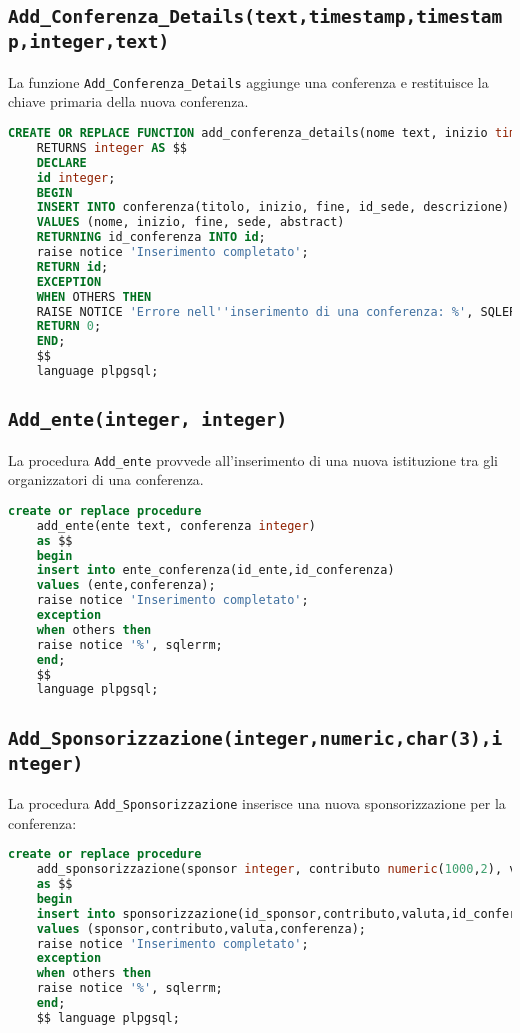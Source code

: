 \subsection{\texttt{Add\_Conferenza\_Details(text,timestamp,timestamp,integer,text)}}
La funzione \texttt{Add\_Conferenza\_Details} aggiunge una conferenza e restituisce la chiave primaria della nuova conferenza.
\begin{lstlisting}[language=SQL,style=mystyle]
	CREATE OR REPLACE FUNCTION add_conferenza_details(nome text, inizio timestamp, fine timestamp, sede integer, abstract text)
	RETURNS integer AS $$
	DECLARE
	id integer;
	BEGIN
	INSERT INTO conferenza(titolo, inizio, fine, id_sede, descrizione) 
	VALUES (nome, inizio, fine, sede, abstract)
	RETURNING id_conferenza INTO id;
	raise notice 'Inserimento completato';
	RETURN id;
	EXCEPTION
	WHEN OTHERS THEN
	RAISE NOTICE 'Errore nell''inserimento di una conferenza: %', SQLERRM;
	RETURN 0; 
	END;
	$$ 
	language plpgsql;
\end{lstlisting}
\subsection{\texttt{Add\_ente(integer, integer)}}
La procedura \texttt{Add\_ente} provvede all'inserimento di una nuova istituzione tra gli organizzatori di una conferenza.
\begin{lstlisting}[language=SQL,style=mystyle]
	create or replace procedure 
	add_ente(ente text, conferenza integer)
	as $$
	begin
	insert into ente_conferenza(id_ente,id_conferenza)
	values (ente,conferenza);
	raise notice 'Inserimento completato';
	exception
	when others then
	raise notice '%', sqlerrm;
	end;
	$$ 
	language plpgsql;
\end{lstlisting}
\subsection{\texttt{Add\_Sponsorizzazione(integer,numeric,char(3),integer)}}
La procedura \texttt{Add\_Sponsorizzazione} inserisce una nuova sponsorizzazione per la conferenza:
\begin{lstlisting}[language=SQL, style=mystyle]
	create or replace procedure 
	add_sponsorizzazione(sponsor integer, contributo numeric(1000,2), valuta char(3), conferenza integer)
	as $$
	begin
	insert into sponsorizzazione(id_sponsor,contributo,valuta,id_conferenza)
	values (sponsor,contributo,valuta,conferenza);
	raise notice 'Inserimento completato';
	exception
	when others then
	raise notice '%', sqlerrm;
	end;
	$$ language plpgsql;
\end{lstlisting}
